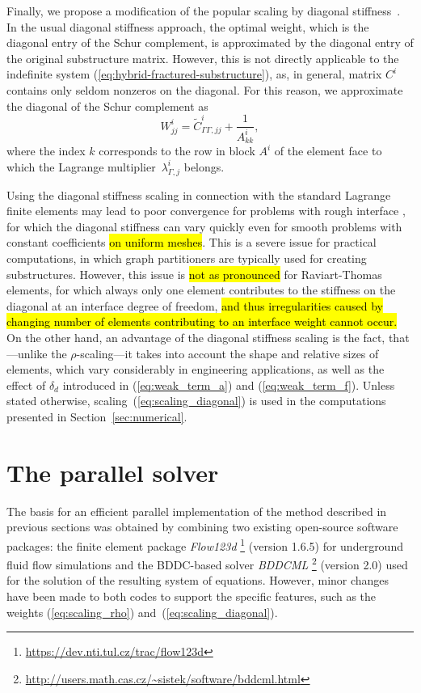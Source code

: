Finally, we propose a modification of the popular scaling by diagonal
stiffness~\cite{Klawonn-2008-AFA}. In the usual diagonal stiffness approach,
the optimal weight, which is the diagonal entry of the Schur complement, is
approximated by the diagonal entry of the original substructure matrix.
However, this is not directly applicable to the indefinite system
(\ref{eq:hybrid-fractured-substructure}), as, in general, matrix $C^{i}$
contains only seldom nonzeros on the diagonal. For this reason, we approximate
the diagonal of the Schur complement as
\begin{equation}
\label{eq:scaling_diagonal}W^{i}_{jj} = \widetilde{C}^{i}_{\Gamma\Gamma,jj} +
\frac{1}{A^{i}_{kk}},
\end{equation}
where the index $k$ corresponds to the row in block $A^{i}$ of the element
face to which the Lagrange multiplier~$\lambda_{\Gamma,j}^{i}$ belongs.

Using the diagonal stiffness scaling in connection with the standard Lagrange
finite elements may lead to poor convergence for problems with rough interface
\cite{Klawonn-2008-AFA,Certikova-2013-SIW}, for which the diagonal stiffness
can vary quickly even for smooth problems with constant coefficients 
\hl{on uniform meshes}. 
This is a severe issue for practical computations, in which graph partitioners are
typically used for creating substructures. 
However, this issue is 
\hl{not as pronounced}
for Raviart-Thomas elements, for which always 
only one element contributes to
the stiffness on the diagonal at an interface degree of freedom,
\hl{and thus irregularities caused by changing number of elements contributing to an interface weight 
cannot occur.}
On the other
hand, an advantage of the diagonal stiffness scaling is the fact,
that---unlike the $\rho$-scaling---it takes into account the shape and
relative sizes of elements, which vary considerably in engineering
applications, as well as the effect of $\delta_{d}$ introduced in
(\ref{eq:weak_term_a}) and (\ref{eq:weak_term_f}). Unless stated otherwise,
scaling~(\ref{eq:scaling_diagonal}) is used in the computations presented in
Section~\ref{sec:numerical}.

\section{The parallel solver}

\label{sec:solver}

The basis for an efficient parallel implementation of the method described in
previous sections was obtained by combining two existing open-source software
packages: the finite element package \textsl{Flow123d}%
\footnote{\url{https://dev.nti.tul.cz/trac/flow123d}} (version 1.6.5) for
underground fluid flow simulations and the BDDC-based solver \textsl{BDDCML}%
\footnote{\url{http://users.math.cas.cz/~sistek/software/bddcml.html}} (version
2.0) used for the solution of the resulting system of equations. However, minor
changes have been made to both codes to support the specific features, such as
the weights (\ref{eq:scaling_rho}) and~(\ref{eq:scaling_diagonal}).

